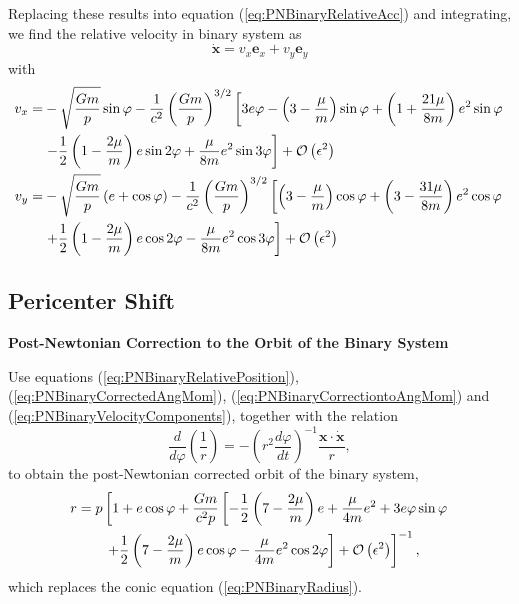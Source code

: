 Replacing these results into equation (\ref{eq:PNBinaryRelativeAcc}) and integrating, we find the relative velocity in binary system as
\begin{equation}
 \dot{\textbf{x}} = v_x \textbf{e}_x + v_y \textbf{e}_y
 \end{equation} 
 with
 \begin{subequations}\label{eq:PNBinaryVelocityComponents}
 \begin{align}
 v_x = &-\sqrt{\frac{Gm}{p}} \sin \varphi
 - \frac{1}{c^2} \left( \frac{Gm}{p} \right)^{3/2}  \left[ 3e\varphi - \left( 3 - \frac{\mu}{m} \right)\sin \varphi + \left( 1 + \frac{21\mu}{8m} \right) e^2 \sin \varphi \right. \notag \\  
 & \left. -\frac{1}{2} \left( 1 - \frac{2\mu}{m} \right)e \sin 2 \varphi + \frac{\mu}{8m} e^2 \sin 3 \varphi\right] + {\mathcal{O} \left( \epsilon^2 \right)} \\
 v_y = &-\sqrt{\frac{Gm}{p}} \left( e + \cos \varphi \right ) - \frac{1}{c^2} \left( \frac{Gm}{p} \right)^{3/2} \left[  \left( 3 - \frac{\mu}{m} \right)\cos \varphi + \left( 3 - \frac{31\mu}{8m} \right) e^2 \cos \varphi  \right .  \notag \\
 & \left. + \frac{1}{2} \left( 1 - \frac{2\mu}{m} \right)e \cos 2 \varphi - \frac{\mu}{8m} e^2 \cos 3 \varphi\right] + {\mathcal{O} \left( \epsilon^2 \right)}
 \end{align}
 \end{subequations}
 
\subsection{Pericenter Shift}

\begin{exercise}
\textbf{Post-Newtonian Correction to the Orbit of the Binary System}

Use equations (\ref{eq:PNBinaryRelativePosition}),(\ref{eq:PNBinaryCorrectedAngMom}), (\ref{eq:PNBinaryCorrectiontoAngMom}) and (\ref{eq:PNBinaryVelocityComponents}), together with the relation
\begin{equation}
\frac{d}{d\varphi} \left( \frac{1}{r} \right) = - \left( r^2 \frac{d\varphi}{dt} \right)^{-1} \frac{\textbf{x} \cdot \dot{\textbf{x}}}{r},
\end{equation}
to obtain the post-Newtonian corrected orbit of the binary system,
\begin{align}
r = p & \left[ 1 + e \cos \varphi + \frac{Gm}{c^2 p}  \left[  -\frac{1}{2} \left( 7 - \frac{2\mu}{m} \right) e  + \frac{\mu}{4m} e^2 + 3 e \varphi \sin \varphi \right. \right. \notag \\
& \left. \left. + \frac{1}{2} \left(7 - \frac{2\mu}{m} \right) e \cos \varphi - \frac{\mu}{4m} e^2 \cos 2\varphi   \right] + {\mathcal{O} \left( \epsilon^2 \right)} \right]^{-1} , \label{eq:PNBinaryCorrectedConic}
\end{align}
which replaces the conic equation (\ref{eq:PNBinaryRadius}).
\end{exercise}

